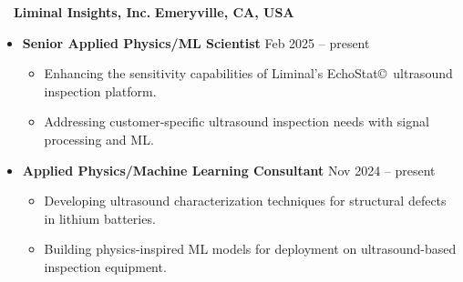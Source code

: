 ~~{\color{black}\textbf{Liminal Insights, Inc.} \hfill  \textbf{Emeryville, CA, USA}}\par
\begin{itemize}
    \item
    \textbf{Senior Applied Physics/ML Scientist}
    \hfill  {Feb 2025 -- present} \par
        \begin{itemize}
            \item Enhancing the sensitivity capabilities of Liminal's EchoStat\copyright~ultrasound inspection platform. 
            \item Addressing customer-specific ultrasound inspection needs with signal processing and ML. 
        \end{itemize}
    \item
        \textbf{Applied Physics/Machine Learning Consultant}
        \hfill  {Nov 2024 -- present} \par
        \begin{itemize}
            \item Developing ultrasound characterization techniques for structural defects in lithium batteries. 
            \item Building physics-inspired ML models for deployment on ultrasound-based inspection equipment.
        \end{itemize}
\end{itemize}
